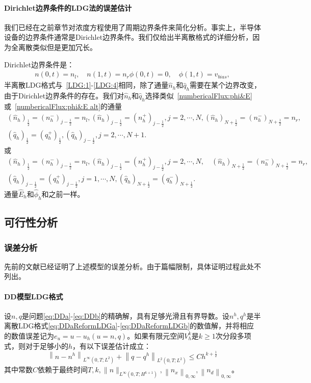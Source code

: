 \paragraph{Dirichlet边界条件的LDG法的误差估计}
我们已经在之前章节对浓度方程使用了周期边界条件来简化分析。事实上，半导体设备的边界条件通常是Dirichlet边界条件。我们仅给出半离散格式的详细分析，因为全离散类似但是更加冗长。

Dirichlet边界条件是：
\begin{align}
    n(0,t) = n_l,\quad n(1,t) = n_r
    \phi(0,t) = 0, \quad \phi(1,t) = v_{bias},
\end{align}
半离散LDG格式与~\eqref{LDG:1}-\eqref{LDG:4}相同，除了通量$\hat{n}_h$和$\hat{q}_h$需要在某个边界改变，由于Dirichlet边界条件的存在。我们对$\hat{n}_h$和$\hat{q}_h$选择类似~\eqref{numbericalFlux:phi&E}或~\eqref{numbericalFlux:phi&E alt}的通量
\begin{align}
    (\hat{n}_h)_{\frac{1}{2}} = (n_h^-)_{j-\frac{1}{2}} =n_l, (\hat{n}_h)_{j-\frac{1}{2}} =  (n_h^+)_{j-\frac{1}{2}},j=2,\cdots,N,  (\hat{n}_h)_{N+\frac{1}{2}} = (n_h^-)_{N+\frac{1}{2}} = n_r, \nonumber \\
    (\hat{q}_h)_{\frac{1}{2}} = (q_h^+)_{\frac{1}{2}}, (\hat{q}_h)_{j-\frac{1}{2}},j=2,\cdots,N+1. \label{numbericalFlux:Dirichlet 1}
\end{align}
或
\begin{align}
    (\hat{n}_h)_{\frac{1}{2}} = (n_h^-)_{j-\frac{1}{2}} = n_l, (\hat{n}_h)_{j-\frac{1}{2}} = (n_h^+)_{j-\frac{1}{2}},j=2,\cdots,N,\quad (\hat{n}_h)_{N+\frac{1}{2}} = (n_h^-)_{N+\frac{1}{2}} = n_r, \nonumber \\
    (\hat{q}_h)_{j - \frac{1}{2}} = (q_h^+)_{j - \frac{1}{2}}, j = 1,\cdots,N,(\hat{q}_h)_{N+\frac{1}{2}} = (q_h^-)_{N+\frac{1}{2}}.\label{numbericalFlux:Dirichlet 2}
\end{align}
通量$\hat{E}_h$和$\hat{\phi}_h$和之前一样。

\subsection{可行性分析}
\subsubsection{误差分析}

先前的文献已经证明了上述模型的误差分析。由于篇幅限制，具体证明过程此处不列出。
\paragraph{DD模型LDG格式}
\begin{theorem}
    设$n, q$是问题\eqref{eq:DDa}-\eqref{eq:DDb}的精确解，具有足够光滑且有界导数。设$n^{h}, q^{h}$是半离散LDG格式\eqref{eq:DDaReformLDGa}-\eqref{eq:DDaReformLDGb}的数值解，并将相应的数值误差记为$e_{u}=u-u_{h}(u=n, q)$。如果有限元空间$V_{h}^{k}$是$k \geq 1$次分段多项式，则对于足够小的$h$，有以下误差估计成立：
    $$
        \left\|n-n^{h}\right\|_{L^{\infty}\left(0, T ; L^{2}\right)}+\left\|q-q^{h}\right\|_{L^{2}\left(0, T ; L^{2}\right)} \leq C h^{k+\frac{1}{2}}
    $$
    其中常数$C$依赖于最终时间$T,k, \|n\|_{L^{\infty}\left(0, T ; H^{k+1}\right)}, \left\|n_{x}\right\|_{0, \infty}, \left\|n_{d}\right\|_{0, \infty}$。
\end{theorem}

